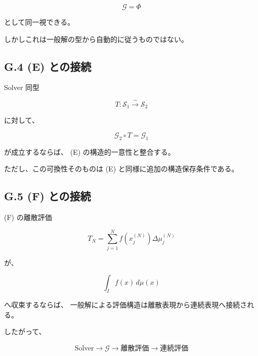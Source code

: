 \documentclass[a4paper,11pt]{article}
\newcommand{\Solver}{\mathcal{S}}
\newcommand{\Eval}{\mathcal{G}}
\begin{document}
\begin{equation}
    \Eval=\Phi
\end{equation}

として同一視できる。

しかしこれは一般解の型から自動的に従うものではない。


\subsection{G.4 (E) との接続}

Solver 同型

\begin{equation}
    T:\Solver_1\overset{\sim}{\longrightarrow}\Solver_2
\end{equation}

に対して、

\begin{equation}
    \Eval_2\circ T
    =
    \Eval_1
\end{equation}

が成立するならば、
(E) の構造的一意性と整合する。

ただし、この可換性そのものは
(E) と同様に追加の構造保存条件である。


\subsection{G.5 (F) との接続}

(F) の離散評価

\begin{equation}
    T_N
    =
    \sum_{j=1}^{N}
    f(x_j^{(N)})
    \Delta\mu_j^{(N)}
\end{equation}

が、

\begin{equation}
    \int_I f(x)\,d\mu(x)
\end{equation}

へ収束するならば、
一般解による評価構造は離散表現から連続表現へ接続される。

したがって、

\begin{equation}
    \boxed{
    \text{Solver}
    \longrightarrow
    \Eval
    \longrightarrow
    \text{離散評価}
    \longrightarrow
    \text{連続評価}
    }
\end{equation}
\end{document}
